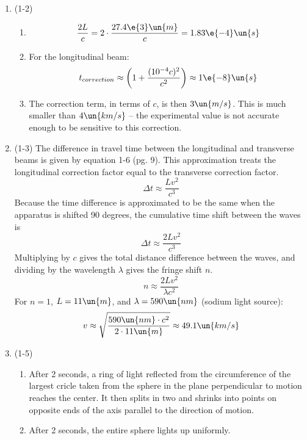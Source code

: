 \documentclass{physicsHW}
\begin{document}
\maketitle

\begin{enumerate}

\item (1-2)
	\begin{enumerate}
		\item 
			\[\frac{2L}{c} = 2 \cdot \frac{27.4\e{3}\un{m}}{c} = 1.83\e{-4}\un{s}\]
		\item For the longitudinal beam:
			\[t_{correction} \approx \left( 1 + \frac{(10^{-4}c)^2}{c^2} \right) \approx 1\e{-8}\un{s}\]
		\item The correction term, in terms of $c$, is then $3 \un{m/s}$. This is much smaller than $4 \un{km/s}$ -- the experimental value is not accurate enough to be sensitive to this correction.
	\end{enumerate}

\item (1-3) The difference in travel time between the longitudinal and transverse beams is given by equation 1-6 (pg. 9). This approximation treats the longitudinal correction factor equal to the transverse correction factor.
	\[\Delta t \approx \frac{Lv^2} {c^3}\]
	Because the time difference is approximated to be the same when the apparatus is shifted 90 degrees, the cumulative time shift between the waves is 
	\[\Delta t \approx \frac {2Lv^2} {c^3} \]
	Multiplying by $c$ gives the total distance difference between the waves, and dividing by the wavelength $\lambda$ gives the fringe shift $n$.
	\[n \approx \frac{2Lv^2} {\lambda c^2}\]
	For $n = 1$, $L = 11 \un{m}$, and $\lambda = 590 \un{nm}$ (sodium light source): 
	\[v \approx \sqrt{\frac{590 \un{nm} \cdot c^2} {2 \cdot 11 \un{m}}} \approx 49.1 \un{km/s} \] 
	

		
	
\item (1-5) 
	\begin{enumerate}
		\item After 2 seconds, a ring of light reflected from the circumference of the largest cricle taken from the sphere in the plane perpendicular to motion reaches the center. It then splits in two and shrinks into points on opposite ends of the axis parallel to the direction of motion.
		\item After 2 seconds, the entire sphere lights up uniformly. 
	\end{enumerate}


\end{enumerate}
\end{document}

